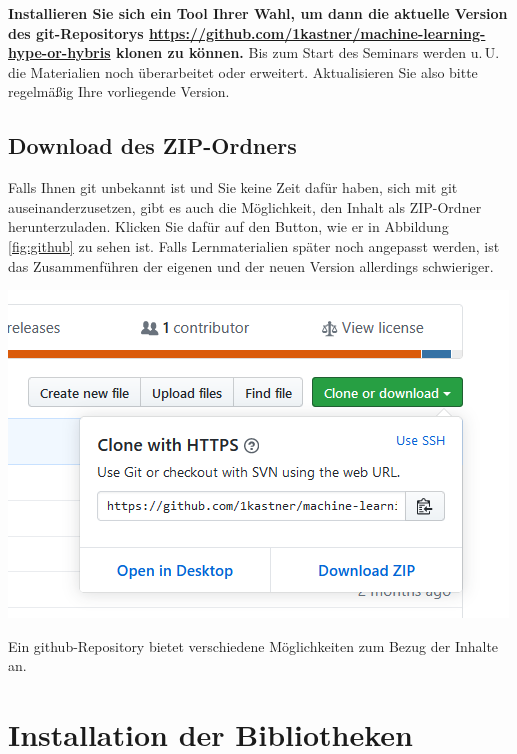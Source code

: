 \documentclass{tufte-handout}
\begin{document}
{
  \bfseries
  Installieren Sie sich ein Tool Ihrer Wahl, um dann die aktuelle Version des git-Repositorys \url{https://github.com/1kastner/machine-learning-hype-or-hybris} klonen zu können.
}
Bis zum Start des Seminars werden u.\,U. die Materialien noch überarbeitet oder erweitert.
Aktualisieren Sie also bitte regelmäßig Ihre vorliegende Version.

\subsection{Download des ZIP-Ordners}

Falls Ihnen git unbekannt ist und Sie keine Zeit dafür haben, sich mit git auseinanderzusetzen, gibt es auch die Möglichkeit, den Inhalt als ZIP-Ordner herunterzuladen.
Klicken Sie dafür auf den Button, wie er in Abbildung\,\ref{fig:github} zu sehen ist.
Falls Lernmaterialien später noch angepasst werden, ist das Zusammenführen der eigenen und der neuen Version allerdings schwieriger.

\begin{marginfigure}
  \includegraphics{github-zip}
  \caption{Ein github-Repository bietet verschiedene Möglichkeiten zum Bezug der Inhalte an.}%
\label{fig:github}
\end{marginfigure}


\section{Installation der Bibliotheken}
\end{document}
